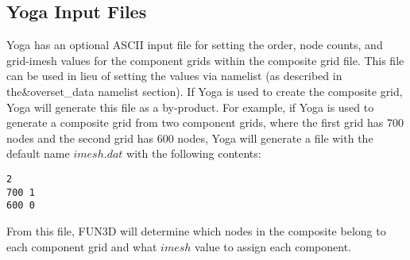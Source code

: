 \subsection{Yoga Input Files}\label{s:yoga.input_files}
Yoga has an optional ASCII input file for setting the order, node counts, and grid-imesh
values for the component grids within the composite grid file.  
This file can be used in lieu of setting the values via namelist
(as described in the\&overset\_data namelist section).
If Yoga is used to create the composite grid, 
Yoga will generate this file as a by-product.  
For example, if Yoga is used to generate a composite grid
from two component grids, where the first grid has 700 nodes and the second grid
has 600 nodes, Yoga will generate a file with the default name $imesh.dat$ with
the following contents:

\begin{verbatim}
2
700 1
600 0
\end{verbatim}

From this file, FUN3D will determine which nodes in the composite belong to each component
grid and what $imesh$ value to assign each component.

